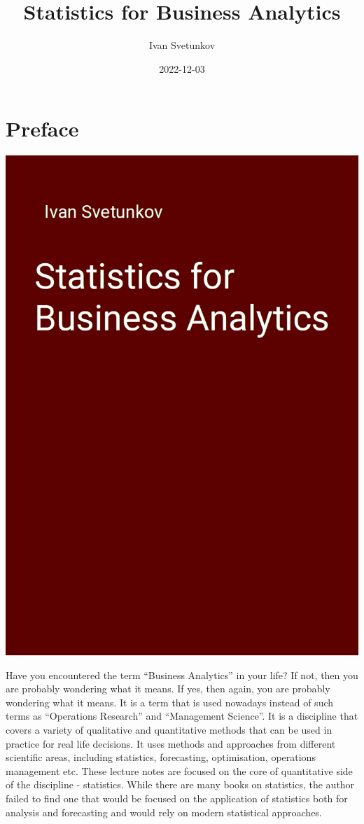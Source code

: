 \documentclass[
]{book}
\title{Statistics for Business Analytics}
\author{Ivan Svetunkov}
\date{2022-12-03}
\theoremstyle{definition}
\theoremstyle{definition}
\theoremstyle{definition}
\theoremstyle{definition}
\theoremstyle{remark}
\begin{document}
\maketitle

{
\setcounter{tocdepth}{1}
\tableofcontents
}
\hypertarget{preface}{%
\chapter*{Preface}\label{preface}}

\begin{center}\includegraphics[width=0.6\linewidth]{images/sba} \end{center}

Have you encountered the term ``Business Analytics'' in your life? If not, then you are probably wondering what it means. If yes, then again, you are probably wondering what it means. It is a term that is used nowadays instead of such terms as ``Operations Research'' and ``Management Science''. It is a discipline that covers a variety of qualitative and quantitative methods that can be used in practice for real life decisions. It uses methods and approaches from different scientific areas, including statistics, forecasting, optimisation, operations management etc. These lecture notes are focused on the core of quantitative side of the discipline - statistics. While there are many books on statistics, the author failed to find one that would be focused on the application of statistics both for analysis and forecasting and would rely on modern statistical approaches.
\end{document}
